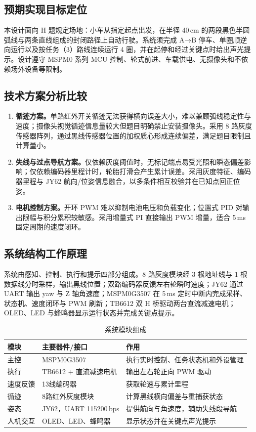 \documentclass[12pt,a4paper,fontset=fandol]{ctexart}
\begin{document}
\subsection{预期实现目标定位}
本设计面向 H 题规定场地：小车从指定起点出发，在半径 40\,cm 的两段黑色半圆弧线与两条直线组成的封闭路径上自动行驶。系统须完成 A→B 停车、单圈顺逆向运行以及按任务（3）路线连续运行 4 圈，并在起停和经过关键点时给出声光提示。设计遵守 MSPM0 系列 MCU 控制、轮式前进、车载供电、无摄像头和不依赖场外设备等限制。

\subsection{技术方案分析比较}
\begin{enumerate}
  \item \textbf{循迹方案。}单路红外开关循迹无法获得横向误差大小，难以兼顾弧线稳定性与速度；摄像头视觉循迹信息量较大但题目明确禁止安装摄像头。采用 8 路灰度传感器阵列，通过黑线传感器位置的加权质心形成连续偏差，满足题目限制且计算量小。
  \item \textbf{失线与过点导航方案。}仅依赖灰度阈值时，无标记端点易受光照和瞬态偏差影响；仅依赖编码器里程计时，轮胎打滑会产生累计误差。采用灰度特征、编码器里程与 JY62 航向/位姿信息融合，以多条件相互校验并在已知点回正位姿。
  \item \textbf{电机控制方案。}开环 PWM 难以抑制电池电压和负载变化；位置式 PID 对输出限幅与积分累积较敏感。采用增量式 PI 直接输出 PWM 增量，适合 5\,ms 固定周期的速度闭环。
\end{enumerate}

\subsection{系统结构工作原理}
系统由感知、控制、执行和提示四部分组成。8 路灰度模块经 3 根地址线与 1 根数据线分时采样，输出黑线位置；双路编码器反馈左右轮瞬时速度；JY62 通过 UART 输出 yaw 与 Z 轴角速度；MSPM0G3507 在 5\,ms 定时中断内完成采样、状态机、速度闭环与 PWM 刷新；TB6612 双 H 桥驱动两台直流减速电机；OLED、LED 与蜂鸣器显示运行状态并完成关键点提示。

\begin{table}[H]
\centering
\caption{系统模块组成}
\begin{tabularx}{\textwidth}{p{2.2cm}p{4cm}Y}
\toprule
模块 & 主要器件/接口 & 作用\\
\midrule
主控 & MSPM0G3507 & 执行实时控制、任务状态机和外设管理\\
执行 & TB6612 + 直流减速电机 & 输出左右轮正向 PWM 驱动\\
速度反馈 & 13线编码器 & 获取轮速与累计里程\\
循迹 & 8路红外灰度模块 & 计算黑线横向偏差与重捕获状态\\
姿态 & JY62，UART 115200\,bps & 提供航向与角速度，辅助失线段导航\\
人机交互 & OLED、LED、蜂鸣器 & 显示状态并在关键点声光提示\\
\bottomrule
\end{tabularx}
\end{table}
\end{document}
